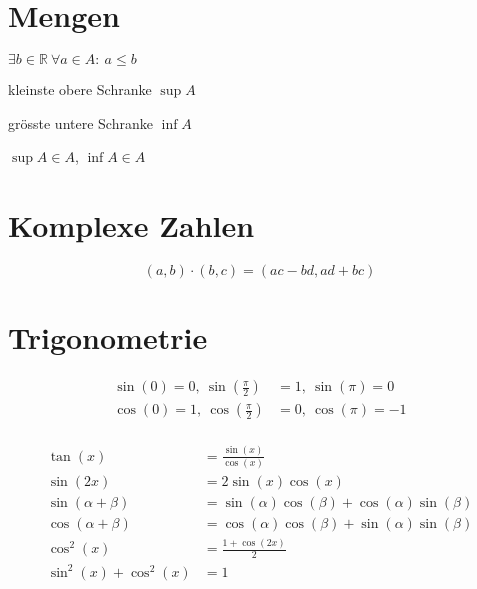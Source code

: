 \documentclass[11pt]{article}
\begin{document}
\section{Mengen}

\begin{description}[labelindent=16pt,style=multiline,leftmargin=5.5cm, noitemsep]
	\item[Obere Schranke:] $\exists b \in \mathbb{R}\ \forall a\in A:\ a \leq b$
	\item[Supremum:] kleinste obere Schranke $\sup A$
	\item[Infimum:] gr{\"o}sste untere Schranke $\inf A$
	\item[Maximum/Minimum:] $\sup A \in A$, $\inf A \in A$
\end{description}

\section{Komplexe Zahlen}

\begin{equation*}
	(a,b) \cdot (b,c) = (ac-bd, ad+bc)
\end{equation*}

\section{Trigonometrie}

\begin{equation*}
\begin{split}
	\sin(0) = 0,\ \sin(\frac{\pi}{2}) & = 1,\ \sin(\pi) = 0\\
	\cos(0) = 1,\ \cos(\frac{\pi}{2}) & = 0,\ \cos(\pi) = -1\\
\end{split}
\end{equation*}

\begin{equation*}
\begin{split}
	\tan(x) & = \frac{\sin(x)}{\cos(x)} \\
	\sin(2x) & = 2\sin(x)\cos(x) \\
	\sin(\alpha + \beta) & = \sin(\alpha)\cos(\beta) + \cos(\alpha)\sin(\beta) \\
	\cos(\alpha + \beta) & = \cos(\alpha)\cos(\beta) + \sin(\alpha)\sin(\beta) \\
	\cos^2(x) & = \frac{1 + \cos(2x)}{2} \\
	\sin^2(x) + \cos^2(x) & = 1
\end{split}
\end{equation*}
\end{document}

